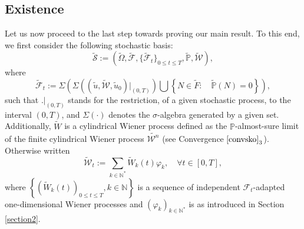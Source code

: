 \documentclass[10pt,number,preprint,times]{elsarticle}
\numberwithin{equation}{section} %
\begin{document}
\subsection{Existence}
Let us now proceed to the last step towards proving our main result. To this end, we first consider the following stochastic basis: 
$$
\tilde{\mathscr{S}}:=\left(\tilde{\Omega},\tilde{\mathcal{F}},\{\tilde{\mathcal{F}}_t\}_{0 \leq t \leq T},\tilde{\mathbb{P}},\tilde{\mathcal{W}}\right),
$$
where
$$
\tilde{\mathcal{F}}_t:={\Sigma}\left(\Sigma\left(\left(\tilde{u},\tilde{\mathcal{W}},\tilde{u}_0\right)|_{(0,T)}\right) \bigcup \left\{N \in \tilde{F}: \quad \tilde{\mathbb{P}}(N)=0\right\} \right),
$$
such that $.|_{(0,T)}$ stands for the restriction, of a given stochastic process, to the interval $(0,T)$, and $\Sigma(\cdot)$ denotes the $\sigma$-algebra generated by a given set.
\noindent
Additionally, $\tilde{W}$ is a cylindrical Wiener process defined as the $\mathbb{P}$-almost-sure limit of the finite cylindrical Wiener process $\tilde{\mathcal{W}^n}$ (see Convergence $\eqref{convsko}_{3}$). Otherwise written
$$
\tilde{\mathcal{W}}_t:= \displaystyle \sum_{k \in \mathbb{N}^*} \tilde{W}_k(t) \varphi_k, \quad \forall t \in [0,T],$$
where $\left\{\left(\tilde{W}_k(t)\right)_{0 \leq t \leq T}, k \in \mathbb{N}\right\}$ is a sequence of independent $\mathcal{F}_t$-adapted one-dimensional Wiener processes and $\left(\varphi_k\right)_{k \in \mathbb{N}^*}$ is as introduced in Section \ref{section2}. 
\end{document}
